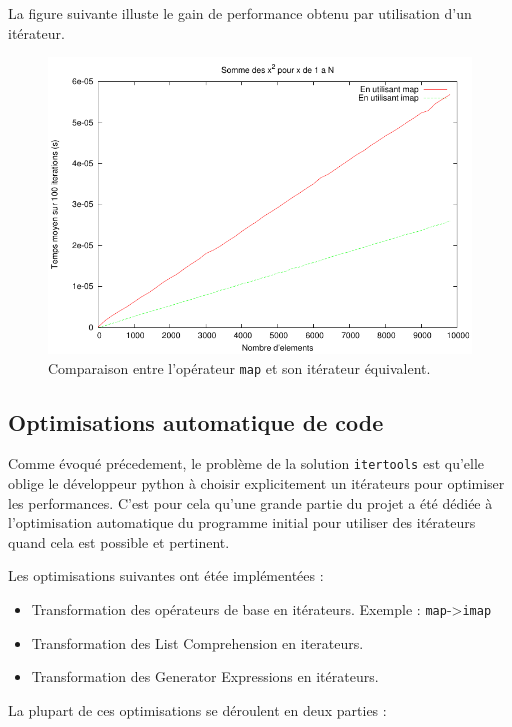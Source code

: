 \documentclass[a4paper]{article}
\begin{document}
La figure suivante illuste le gain de performance obtenu par
utilisation d'un itérateur.

\begin{figure}[h!]
  \includegraphics[width=\textwidth]{MapImap}
  \caption{Comparaison entre l'opérateur \texttt{map} et son itérateur équivalent.}
\end{figure}


\subsection*{Optimisations automatique de code}

Comme évoqué précedement, le problème de la solution \texttt{itertools} est
qu'elle oblige le développeur python à choisir explicitement un
itérateurs pour optimiser les performances. C'est pour cela qu'une
grande partie du projet a été dédiée à l'optimisation automatique du
programme initial pour utiliser des itérateurs quand cela est possible
et pertinent.

Les optimisations suivantes ont étée implémentées :

\begin{itemize}
\item Transformation des opérateurs de base en itérateurs. Exemple :
  \texttt{map}->\texttt{imap}
\item Transformation des List Comprehension en iterateurs.
\item Transformation des Generator Expressions en itérateurs.
\end{itemize}

La plupart de ces optimisations se déroulent en deux parties :
\end{document}

